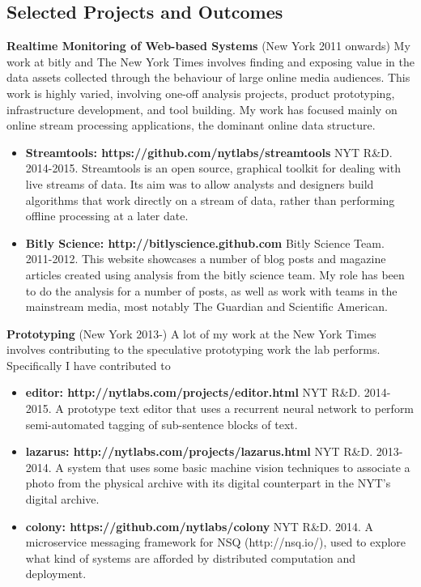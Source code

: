 \documentclass{res}
\begin{document}
\begin{resume}
\section{Selected Projects and Outcomes}
\vspace{1em}
\textbf{Realtime Monitoring of Web-based Systems} (New York 2011 onwards) My work at bitly and The New York Times involves finding and exposing value in the data assets collected through the behaviour of large online media audiences. This work is highly varied, involving one-off analysis projects, product prototyping, infrastructure development, and tool building. My work has focused mainly on online stream processing applications, the dominant online data structure.
\begin{itemize}
    \item \textbf{Streamtools: https://github.com/nytlabs/streamtools} NYT R\&D. 2014-2015. Streamtools is an open source, graphical toolkit for dealing with live streams of data. Its aim was to allow analysts and designers build algorithms that work directly on a stream of data, rather than performing offline processing at a later date.
    \item \textbf{Bitly Science: http://bitlyscience.github.com} Bitly Science Team. 2011-2012. This website showcases a number of blog posts and magazine articles created using analysis from the bitly science team. My role has been to do the analysis for a number of posts, as well as work with teams in the mainstream media, most notably The Guardian and Scientific American.
\end{itemize}

\textbf{Prototyping} (New York 2013-) A lot of my work at the New York Times involves contributing to the speculative prototyping work the lab performs. Specifically I have contributed to
\begin{itemize}
\item \textbf{editor: http://nytlabs.com/projects/editor.html} NYT R\&D. 2014-2015. A prototype text editor that uses a recurrent neural network to perform semi-automated tagging of sub-sentence blocks of text.
\item \textbf{lazarus: http://nytlabs.com/projects/lazarus.html} NYT R\&D. 2013-2014. A system that uses some basic machine vision techniques to associate a photo from the physical archive with its digital counterpart in the NYT's digital archive.
\item \textbf{colony: https://github.com/nytlabs/colony} NYT R\&D. 2014. A microservice messaging framework for NSQ (http://nsq.io/), used to explore what kind of systems are afforded by distributed computation and deployment.
\end{itemize}
    

\end{resume}
\end{document}
